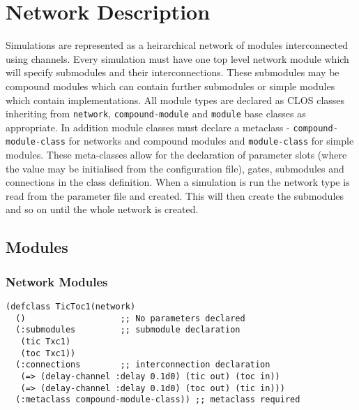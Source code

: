 \documentclass[a4paper,11pt,twoside,openany]{report}
\newcommand{\acr}[1]{\acrshort{#1}}
\begin{document}



\chapter{Network Description}

Simulations are represented as a heirarchical network of
modules interconnected using channels. Every simulation must have one
top level network module which will specify submodules and their
interconnections. These submodules may be compound modules which can
contain further submodules or simple modules which contain
implementations. All module types are declared as \acr{CLOS} classes
inheriting from \lstinline{network}, \lstinline{compound-module} and
\lstinline{module} base classes as appropriate. In addition module classes
must declare a metaclass - \lstinline{compound-module-class} for
networks and compound modules and \lstinline{module-class} for simple
modules. These meta-classes allow for the declaration of parameter
slots (where the value may be initialised from the configuration
file), gates, submodules and connections in the class definition.
When a simulation is run the network type is read from the parameter
file and created. This will then create the submodules and so on until
the whole network is created.

\section{Modules}
\subsection{Network Modules}

\begin{lstlisting}[caption={An example of a simple network},label=lst:tictoc1]
(defclass TicToc1(network)
  ()                   ;; No parameters declared
  (:submodules         ;; submodule declaration
   (tic Txc1)
   (toc Txc1))
  (:connections        ;; interconnection declaration
   (=> (delay-channel :delay 0.1d0) (tic out) (toc in))
   (=> (delay-channel :delay 0.1d0) (toc out) (tic in)))
  (:metaclass compound-module-class)) ;; metaclass required
\end{lstlisting}
\end{document}
